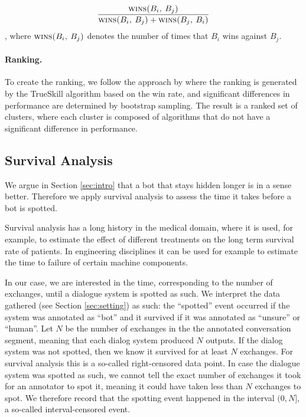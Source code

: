 \documentclass[11pt,a4paper]{article}
\begin{document}
\begin{equation}\label{eq:win_function}
    \frac{\textsc{wins($B_i$, $B_j$)}}{\textsc{wins($B_i$, $B_j$)} + \textsc{wins($B_j$, $B_i$)}}
\end{equation},
where $\textsc{wins($B_i$, $B_j$)}$ denotes the number of times that $B_i$ wins against $B_j$.  %

\paragraph{Ranking.}
To create the ranking, we follow the approach by  where the ranking is generated by the TrueSkill algorithm based on the win rate, and significant differences in performance are determined by bootstrap sampling. The result is a ranked set of clusters, where each cluster is composed of algorithms that do not have a significant difference in performance. 

\subsection{Survival Analysis}

We argue in Section \ref{sec:intro} that a bot that stays hidden longer is in a sense better. Therefore we apply survival analysis to assess the time it takes before a bot is spotted.

Survival analysis has a long history in the medical domain, where it is used, for example, to estimate the effect of different treatments on the long term survival rate of patients. In engineering disciplines it can be used for example to estimate the time to failure of certain machine components.

In our case, we are interested in the time, corresponding to the number of exchanges, until a dialogue system is spotted as such. We interpret the data gathered (see Section \ref{sec:setting}) as such: the ``spotted'' event occurred if the system was annotated as ``bot'' and it survived if it was annotated as ``unsure'' or ``human''. Let $N$ be the number of exchanges in the the annotated conversation segment, meaning that each dialog system produced $N$ outputs. If the dialog system was not spotted, then we know it survived for at least $N$ exchanges. For survival analysis this is a so-called right-censored data point. In case the dialogue system was spotted as such, we cannot tell the exact number of exchanges it took for an annotator to spot it, meaning it could have taken less than $N$ exchanges to spot. We therefore record that the spotting event happened in the interval $(0, N]$, a so-called interval-censored event.
\end{document}
